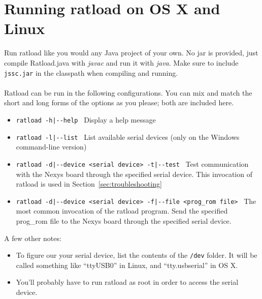 \documentclass[notitlepage]{article}
\begin{document}
\section{Running ratload on OS X and Linux}
Run ratload like you would any Java project of your own. No jar is provided, just compile Ratload.java with \emph{javac} and run it with \emph{java}. Make sure to include \texttt{jssc.jar} in the classpath when compiling and running.\\\\
Ratload can be run in the following configurations. You can mix and match the short and long forms of the options as you please; both are included here.
\begin{itemize}
\item \texttt{ratload -h|-{}-help} ~Display a help message
\item \texttt{ratload -l|-{}-list} ~List available serial devices (only on the Windows command-line version)
\item \texttt{ratload -d|-{}-device <serial device> -t|-{}-test} ~Test communication with the Nexys board through the specified serial device. This invocation of ratload is used in Section~\ref{sec:troubleshooting}
\item \texttt{ratload -d|-{}-device <serial device> -f|-{}-file <prog\_rom file>} ~The most common invocation of the ratload program. Send the specified prog\_rom file to the Nexys board through the specified serial device.
\end{itemize}
A few other notes:
\begin{itemize}
\item To figure our your serial device, list the contents of the \texttt{/dev} folder. It will be called something like ``ttyUSB0'' in Linux, and ``tty.usbserial'' in OS X.
\item You'll probably have to run ratload as root in order to access the serial device.
\end{itemize}
\end{document}
